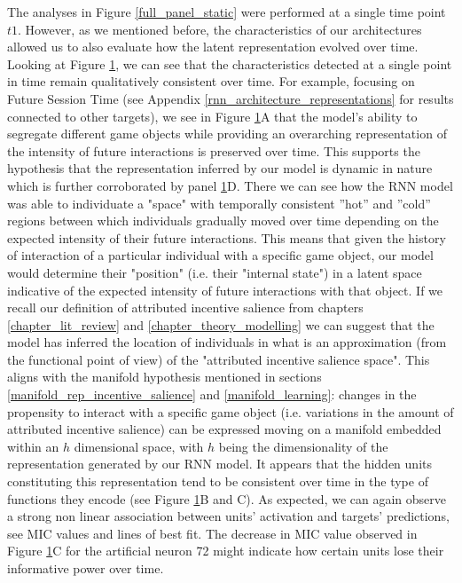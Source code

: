 \begin{figure}[ht]
\label{full_panel_temporal}
\end{figure}
The analyses in Figure \ref{full_panel_static} were performed at a single time point $t1$. However, as we mentioned before, the characteristics of our architectures allowed us to also evaluate how the latent representation evolved over time. Looking at Figure \ref{full_panel_temporal}, we can see that the characteristics detected at a single point in time remain qualitatively consistent over time. For example, focusing on Future Session Time (see Appendix \ref{rnn_architecture_representations} for results connected to other targets), we see in Figure \ref{full_panel_temporal}A that the model's ability to segregate different game objects while providing an  overarching representation of the intensity of future interactions is preserved over time. This supports the hypothesis that the representation inferred by our model is dynamic in nature which is further corroborated by panel \ref{full_panel_temporal}D. There we can see how the RNN model was able to individuate a "space" with temporally consistent ”hot” and ”cold” regions between which individuals gradually moved over time depending on the expected intensity of their future interactions. This means that given the history of interaction of a particular individual with a specific game object, our model would determine their "position" (i.e. their "internal state") in a latent space indicative of the expected intensity of future interactions with that object. If we recall our definition of attributed incentive salience from chapters \ref{chapter_lit_review} and \ref{chapter_theory_modelling} we can suggest that the model has inferred the location of individuals in what is an approximation (from the functional point of view) of the "attributed incentive salience space". This aligns with the manifold hypothesis mentioned in sections \ref{manifold_rep_incentive_salience} and \ref{manifold_learning}: changes in the propensity to interact with a specific game object (i.e. variations in the amount of attributed incentive salience) can be expressed moving on a manifold embedded within an $h$ dimensional space, with $h$ being the dimensionality of the representation generated by our RNN model. It appears that the hidden units constituting this representation tend to be consistent over time in the type of functions they encode (see Figure \ref{full_panel_temporal}B and C). As expected, we can again observe a strong non linear association between units' activation and targets' predictions, see MIC values and lines of best fit. The decrease in MIC value observed in Figure \ref{full_panel_temporal}C for the artificial neuron 72 might indicate how certain units lose their informative power over time.
